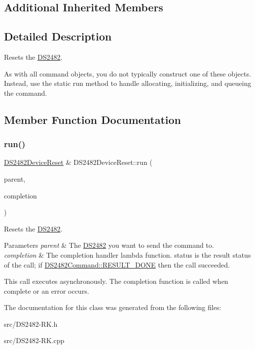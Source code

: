 \subsection*{Additional Inherited Members}


\subsection{Detailed Description}
Resets the \mbox{\hyperlink{class_d_s2482}{D\+S2482}}. 

As with all command objects, you do not typically construct one of these objects. Instead, use the static run method to handle allocating, initializing, and queueing the command. 

\subsection{Member Function Documentation}
\mbox{\label{class_d_s2482_device_reset_a4250bda2cf91a9c21c9ac4844e05689b}} 
\subsubsection{\texorpdfstring{run()}{run()}}
{\footnotesize\ttfamily \mbox{\hyperlink{class_d_s2482_device_reset}{D\+S2482\+Device\+Reset}} \& D\+S2482\+Device\+Reset\+::run (\begin{DoxyParamCaption}\item[{\mbox{\hyperlink{class_d_s2482}{D\+S2482}} \&}]{parent,  }\item[{std\+::function$<$ void(\mbox{\hyperlink{class_d_s2482_device_reset}{D\+S2482\+Device\+Reset}} \&, int status)$>$}]{completion }\end{DoxyParamCaption})\hspace{0.3cm}{\ttfamily [static]}}



Resets the \mbox{\hyperlink{class_d_s2482}{D\+S2482}}. 


\begin{DoxyParams}{Parameters}
{\em parent} & The \mbox{\hyperlink{class_d_s2482}{D\+S2482}} you want to send the command to.\\
\hline
{\em completion} & The completion handler lambda function. status is the result status of the call; if \mbox{\hyperlink{class_d_s2482_command_a8ffcf84807c97928dbfc61d75788e32b}{D\+S2482\+Command\+::\+R\+E\+S\+U\+L\+T\+\_\+\+D\+O\+NE}} then the call succeeded.\\
\hline
\end{DoxyParams}
This call executes asynchronously. The completion function is called when complete or an error occurs. 

The documentation for this class was generated from the following files\+:\begin{DoxyCompactItemize}
\item 
src/D\+S2482-\/\+R\+K.\+h\item 
src/D\+S2482-\/\+R\+K.\+cpp\end{DoxyCompactItemize}
